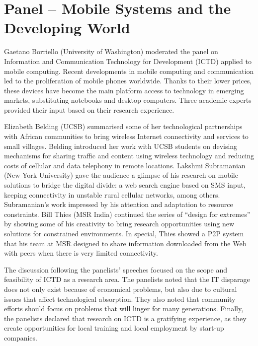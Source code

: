 \section{Panel -- Mobile Systems and the Developing World}
\label{sec:panel}

Gaetano Borriello (University of Washington) moderated the panel on
Information and Communication Technology for Development (ICTD) applied
to mobile computing. Recent developments in mobile computing and
communication led to the proliferation of mobile phones worldwide.
Thanks to their lower prices, these devices have become the main
platform access to technology in emerging markets, substituting
notebooks and desktop computers. Three academic experts provided their
input based on their research experience.

Elizabeth Belding (UCSB) summarised some of her technological
partnerships with African communities to bring wireless Internet
connectivity and services to small villages. Belding introduced her work
with UCSB students on devising mechanisms for sharing traffic and
content using wireless technology and reducing costs of cellular and
data telephony in remote locations. Lakshmi Subramanian (New York
University) gave the audience a glimpse of his research on mobile
solutions to bridge the digital divide: a web search engine based on SMS
input, keeping connectivity in unstable rural cellular networks, among
others. Subramanian's work impressed by his attention and adaptation to
resource constraints. Bill Thies (MSR India) continued the series of
``design for extremes'' by showing some of his creativity to bring
research opportunities using new solutions for constrained environments.
In special, Thies showed a P2P system that his team at MSR designed to
share information downloaded from the Web with peers when there is very
limited connectivity.

The discussion following the panelists' speeches focused on the scope
and feasibility of ICTD as a research area. The panelists noted that the
IT disparage does not only exist because of economical problems, but
also due to cultural issues that affect technological absorption. They
also noted that community efforts should focus on problems that will
linger for many generations. Finally, the panelists declared that
research on ICTD is a gratifying experience, as they create
opportunities for local training and local employment by start-up
companies.
